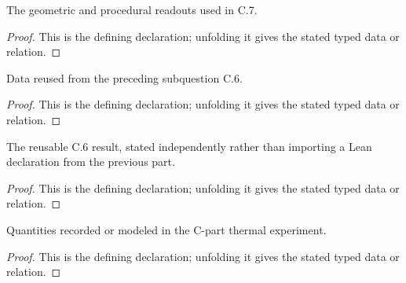 \begin{definition}
  \label{decl:physics:IPhO_2026_4_C_7:Figure17AndProcedureReadout}
  The geometric and procedural readouts used in C.7.
\end{definition}
\begin{proof}
  This is the defining declaration; unfolding it gives the stated typed data or relation.
\end{proof}

\begin{definition}
  \label{decl:physics:IPhO_2026_4_C_7:PreviousPartC6Data}
  Data reused from the preceding subquestion C.6.
\end{definition}
\begin{proof}
  This is the defining declaration; unfolding it gives the stated typed data or relation.
\end{proof}

\begin{definition}
  \label{decl:physics:IPhO_2026_4_C_7:PreviousPartC6Result}
  The reusable C.6 result, stated independently rather than importing a Lean declaration from the previous part.
\end{definition}
\begin{proof}
  This is the defining declaration; unfolding it gives the stated typed data or relation.
\end{proof}

\begin{definition}[ThermalConductionExperiment]
  \label{decl:physics:IPhO_2026_4_C_7:ThermalConductionExperiment}
  Quantities recorded or modeled in the C-part thermal experiment.
\end{definition}
\begin{proof}
  This is the defining declaration; unfolding it gives the stated typed data or relation.
\end{proof}


